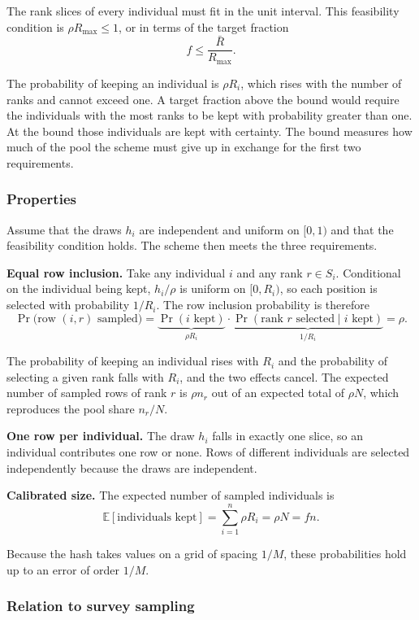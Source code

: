 \documentclass[11pt]{article}
\begin{document}
The rank slices of every individual must fit in the unit interval. This feasibility condition is $\rho R_{\max} \le 1$, or in terms of the target fraction
\[
f \le \frac{\bar{R}}{R_{\max}}.
\]

The probability of keeping an individual is $\rho R_i$, which rises with the number of ranks and cannot exceed one. A target fraction above the bound would require the individuals with the most ranks to be kept with probability greater than one. At the bound those individuals are kept with certainty. The bound measures how much of the pool the scheme must give up in exchange for the first two requirements.

\subsubsection*{Properties}

Assume that the draws $h_i$ are independent and uniform on $[0, 1)$ and that the feasibility condition holds. The scheme then meets the three requirements.

\textbf{Equal row inclusion.} Take any individual $i$ and any rank $r \in S_i$. Conditional on the individual being kept, $h_i / \rho$ is uniform on $[0, R_i)$, so each position is selected with probability $1 / R_i$. The row inclusion probability is therefore
\[
\Pr\big(\text{row } (i, r) \text{ sampled}\big) = \underbrace{\Pr(i \text{ kept})}_{\rho R_i} \cdot \underbrace{\Pr(\text{rank } r \text{ selected} \mid i \text{ kept})}_{1 / R_i} = \rho.
\]

The probability of keeping an individual rises with $R_i$ and the probability of selecting a given rank falls with $R_i$, and the two effects cancel. The expected number of sampled rows of rank $r$ is $\rho n_r$ out of an expected total of $\rho N$, which reproduces the pool share $n_r / N$.

\textbf{One row per individual.} The draw $h_i$ falls in exactly one slice, so an individual contributes one row or none. Rows of different individuals are selected independently because the draws are independent.

\textbf{Calibrated size.} The expected number of sampled individuals is
\[
\mathbb{E}[\text{individuals kept}] = \sum_{i=1}^{n} \rho R_i = \rho N = f n.
\]

Because the hash takes values on a grid of spacing $1 / M$, these probabilities hold up to an error of order $1 / M$.

\subsubsection*{Relation to survey sampling}
\end{document}
